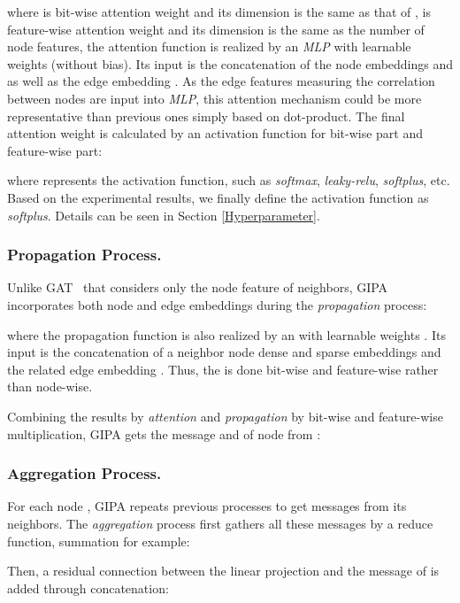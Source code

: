 \documentclass[runningheads]{llncs}
\newcommand{\model}{GIPA\xspace}
\begin{document}
\noindent where  is bit-wise attention weight and its dimension is the same as that of ,  is feature-wise attention weight and its dimension is the same as the number of node features, the attention function  is realized by an \textit{MLP} with learnable weights  (without bias). Its input is the concatenation of the node embeddings  and  as well as the edge embedding . As the edge features  measuring the correlation between nodes are input into \textit{MLP}, this attention mechanism could be more representative than previous ones simply based on dot-product. The final attention weight is calculated by an  activation function for bit-wise part and feature-wise part:

\noindent where  represents the activation function, such as \textit{softmax}, \textit{leaky-relu}, \textit{softplus},  etc. Based on the experimental results, we finally define the activation function as \textit{softplus}.  Details can be seen in Section \ref{Hyperparameter}.

\subsubsection{Propagation Process.}
Unlike GAT~\cite{velivckovic2017graph} that considers only the node feature of neighbors, \model incorporates both node and edge embeddings during the \textit{propagation} process:



\noindent where the propagation function  is also realized by an  with learnable weights . Its input is the concatenation of a neighbor node dense and sparse embeddings  and the related edge embedding . Thus, the  is done bit-wise and feature-wise rather than node-wise. 

Combining the results by \textit{attention} and \textit{propagation} by bit-wise and feature-wise multiplication, \model gets the message  and  of node  from :




\subsubsection{Aggregation Process.}
For each node , \model repeats previous processes to get messages from its neighbors. The \textit{aggregation} process first gathers all these messages by a reduce function, summation for example:





\noindent Then, a residual connection between the linear projection  and the message of  is added through concatenation: 
\end{document}
